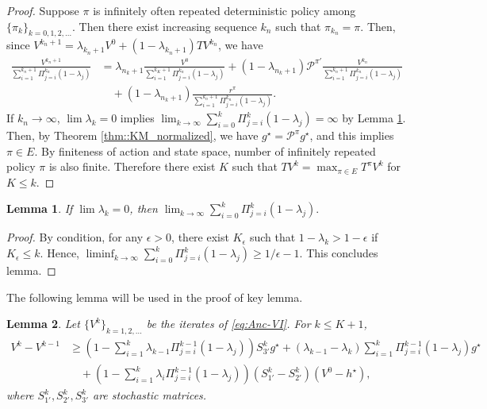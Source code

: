 \documentclass{article} %
\newcommand{\cP}{\mathcal{P}}
\newcommand*{\para}[1]{\left({#1}\right)}
\newtheorem{lemma}{Lemma}
\begin{document}
\begin{proof}
 Suppose $\pi$ is infinitely often repeated deterministic policy among $\{\pi_k\}_{k=0, 1,2,\dots}$. Then there exist increasing sequence $k_n$ such that $\pi_{k_n}=\pi$. Then, since $  V^{k_n+1} = \lambda_{k_n+1}V^{0}+(1-\lambda_{k_n+1})TV^{k_n}$, we have
   \begin{align*}
        \frac{V^{k_n+1}}{\sum_{i=1}^{k_n+1} \Pi^{k_n}_{j=i} (1-\lambda_j)} &= \lambda_{n_{k}+1}\frac{V^{0}}{\sum_{i=1}^{k_K+1} \Pi^{k_n}_{j=i} (1-\lambda_j)}+(1-\lambda_{n_{k}+1})\cP^{\pi'}\frac{V^{k_n}}{\sum_{i=1}^{k_n+1} \Pi^{k_n}_{j=i} (1-\lambda_j)} 
        \\& \quad + (1-\lambda_{n_{k}+1})\frac{r^{\pi}}{{\sum_{i=1}^{k_n+1} \Pi^{k_n}_{j=i} (1-\lambda_j)}}.
    \end{align*}
  If $k_n \rightarrow \infty$, $\lim \lambda_k = 0$ implies $\lim_{k\rightarrow \infty} \sum_{i=0}^{k} \Pi^{k}_{j=i} (1-\lambda_j) = \infty$ by Lemma \ref{lem::anc_coeff}. Then, by Theorem \ref{thm::KM_normalized}, we have $g^{\star} = \cP^{\pi}g^{\star}$, and this implies $\pi \in E$. By finiteness of action and state space, number of infinitely repeated policy $\pi$ is also finite. Therefore there exist $K$ such that $TV^k=\max_{\pi \in E}T^{\pi}V^k$ for $K \le k$.
\end{proof}
\begin{lemma}\label{lem::anc_coeff}
  If $\lim \lambda_k = 0$, then $\lim_{k\rightarrow \infty} \sum_{i=0}^{k} \Pi^{k}_{j=i} (1-\lambda_j). $  
\end{lemma}
\begin{proof}
    By condition, for any $\epsilon>0 $, there exist $K_{\epsilon}$ such that $1-\lambda_k > 1-\epsilon$ if $ K_\epsilon\le k$. Hence,  
    $\liminf_{k\rightarrow \infty} \sum_{i=0}^{k} \Pi^{k}_{j=i} (1-\lambda_j) \ge 1/\epsilon-1$. This concludes lemma. 
\end{proof}
The following lemma will be used in the proof of key lemma. 
\begin{lemma}\label{lem::anc_lower_bound_N}
Let $\{V^k\}_{k=1,2,\dots}$ be the iterates of \ref{eq:Anc-VI}. For $k \le K+1$, 
\begin{align*}
V^k-V^{k-1} &\ge \para{1-\sum_{i=1}^{k} \lambda_{k-1} \Pi^{k-1}_{j=i} (1-\lambda_j)}S_{3'}^{k}g^{\star} +(\lambda_{k-1}-\lambda_{k})  \sum_{i=1}^{k} \Pi^{k-1}_{j=i} (1-\lambda_j)g^{\star}
\\& \quad + \para{1-\sum_{i=1}^{k} \lambda_i \Pi^{k-1}_{j=i} (1-\lambda_j)}(S^{k}_{1'} -S^{k}_{2'})(V^0-h^{\star}),
\end{align*}
where $S_{1'}^k,S_{2'}^k,S_{3'}^k$ are stochastic matrices. 
\end{lemma}    
\end{document}

